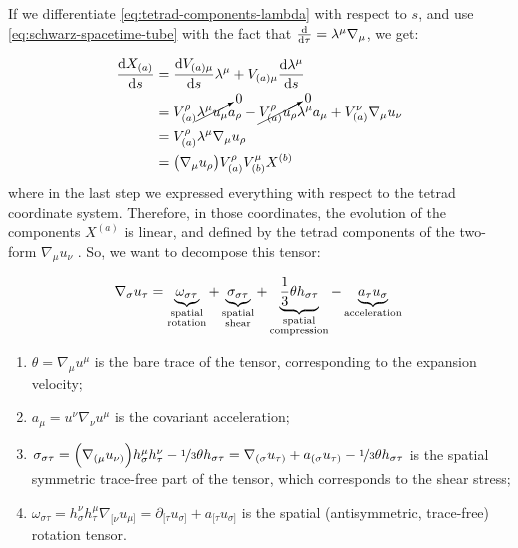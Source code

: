 \documentclass[main.tex]{subfiles}
\begin{document}
If we differentiate \eqref{eq:tetrad-components-lambda} with respect to \(s\), and use \eqref{eq:schwarz-spacetime-tube} with the fact that \(\dv{}{\tau} = \lambda^\mu \nabla_\mu \), we get:

\begin{subequations}
\begin{align}
    \dv{X_{(a)}}{s} &= \dv{V_{(a)\mu}}{s} \lambda^\mu + V_{(a)\mu} \dv{\lambda^\mu}{s}  \\
    &= V_{(a)}^\rho \cancelto{0}{\lambda^\mu u_\mu} a_\rho - \cancelto{0}{V_{(a)}^\rho  u_\rho} \lambda^\mu a_\mu
    + V_{(a)}^\nu \nabla_\mu u_\nu  \\
    &= V^\rho _{(a)} \lambda^\mu \nabla_\mu u_\rho  \\
    &= \qty(\nabla_\mu u_\rho) V^\rho_{(a)} V^{\mu}_{(b)} X^{(b)}
\end{align}
\end{subequations}
where in the last step we expressed everything with respect to the tetrad coordinate system. Therefore, in those coordinates, the evolution of the components \(X^{(a)}\) is linear, and defined by the tetrad components of the two-form \(\nabla_\mu u_\nu\) \cite[section 4]{Taub:1978}.
So, we want to decompose this tensor:

\begin{equation} \label{eq:covariant-acceleration-decomposition}
    \nabla_\sigma u_\tau =
    \underbrace{\omega_{\sigma \tau}}_{\substack{\text{spatial} \\ \text{rotation}}}
    + \underbrace{\sigma_{\sigma\tau}}_{\substack{\text{spatial} \\ \text{shear}}}
    + \underbrace{\frac{1}{3} \theta h_{\sigma\tau}}_{\substack{\text{spatial} \\
    \text{compression}}}
    - \underbrace{ a_\tau u_\sigma}_{ \text{acceleration}} \\
\end{equation}

\begin{enumerate}
    \item \(\theta = \nabla_\mu u^\mu\) is the bare trace of the tensor, corresponding to the expansion velocity;
    \item \(a_\mu = u^\nu \nabla_\nu u^\mu\) is the covariant acceleration;
    \item \(\sigma_{\sigma \tau} = \qty(\nabla_{(\mu} u_{\nu)}) h^\mu_\sigma h^\nu _\tau - \frac[i]{1}{3} \theta h_{\sigma \tau} = \nabla_{(\sigma} u_{\tau)} + a_{(\sigma} u_{\tau)} - \frac[i]{1}{3} \theta h_{\sigma \tau} \) is the spatial symmetric trace-free part of the tensor, which corresponds to the shear stress;
    \item \(\omega_{\sigma \tau} = h^\nu_\sigma h^\mu_\tau \nabla_{[\nu} u_{\mu]} = \partial_{[\tau} u_{\sigma]} + a_{[\tau} u_{\sigma]}\) is the spatial (antisymmetric, trace-free) rotation tensor.
\end{enumerate}
\end{document}
